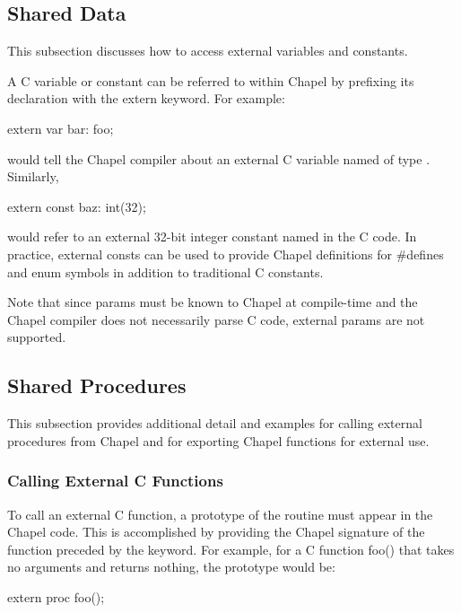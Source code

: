 \subsection{Shared Data}
\label{Shared_Data}

This subsection discusses how to access external variables and constants.

A C variable or constant can be referred to within Chapel by prefixing
its declaration with the extern keyword.  For example:
\begin{chapel}
    extern var bar: foo;
\end{chapel}
\noindent
would tell the Chapel compiler about an external C variable named
 of type .  Similarly,
\begin{chapel}
   extern const baz: int(32);
\end{chapel}
would refer to an external 32-bit integer constant named  in the
C code.  In practice, external consts can be used to provide Chapel
definitions for \#defines and enum symbols in addition to traditional C
constants.

\begin{craychapel}
Note that since params must be known to Chapel at compile-time and
the Chapel compiler does not necessarily parse C code,
external params are not supported.
\end{craychapel}

\subsection{Shared Procedures}
\label{Shared_Procedures}

This subsection provides additional detail and examples for calling external
procedures from Chapel and for exporting Chapel functions for external use.

\subsubsection{Calling External C Functions}
\label{Calling_External_C_Functions}

To call an external C function, a prototype of
the routine must appear in the Chapel code.  This is accomplished by providing
the Chapel signature of the function preceded by the  keyword.  For
example, for a C function foo() that takes no arguments and returns
nothing, the prototype would be:
\begin{chapel}
       extern proc foo();
\end{chapel}

